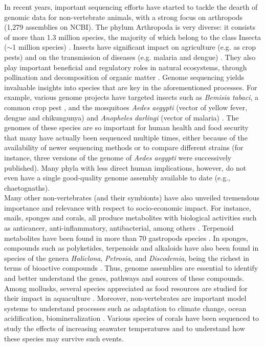 In recent years, important sequencing efforts have started to tackle the dearth of genomic data for non-vertebrate animals, with a strong focus on arthropods (1,279 assemblies on NCBI). The phylum Arthropoda is very diverse: it consists of more than 1.3 million species, the majority of which belong to the class Insecta ($\sim$1 million species) \cite{Zhang2013}. Insects have significant impact on agriculture (e.g. as crop pests) and on the transmission of diseases (e.g. malaria and dengue) \cite{li2019}. They also play important beneficial and regulatory roles in natural ecosystems, through  pollination and decomposition of organic matter \cite{noriega2018}. Genome sequencing yields invaluable insights into species that are key in the aforementioned processes. For example, various genome projects have targeted insects such as \textit{Bemisia tabaci}, a common crop pest \cite{chen2016}, and the mosquitoes \textit{Aedes aegypti} (vector of yellow fever, dengue and chikungunya) \cite{aedes_aegypti3} and \textit{Anopheles darlingi} (vector of malaria) \cite{marinotti2013}. The genomes of these species are so important for human health and food security that many have actually been sequenced multiple times, either because of the availability of newer sequencing methods or to compare different strains (for instance, three versions of the genome of \textit{Aedes aegypti} \cite{aedes_aegypti, 3d-dna, aedes_aegypti3} were successively published). Many phyla with less direct human implications, however, do not even have a single good-quality genome assembly available to date (e.g., chaetognaths). \\ 

Many other non-vertebrates (and their symbionts) have also unveiled tremendous importance and relevance with respect to socio-economic impact. For instance, snails, sponges and corals, all produce metabolites with biological activities such as anticancer, anti-inflammatory, antibacterial, among others \cite{carroll2021, khalifa2019, ng2015}. Terpenoid metabolites have been found in more than 70 gastropods species \cite{avila2020}. In sponges, compounds such as polyketides, terpenoids and alkaloids have also been found in species of the genera \textit{Haliclona}, \textit{Petrosia}, and \textit{Discodemia}, being the richest in terms of bioactive compounds \cite{Han2019}. Thus, genome assemblies are essential to identify and better understand the genes, pathways and sources of these compounds. Among mollusks, several species appreciated as food resources are studied for their impact in aquaculture \cite{takeuchi2017}. Moreover, non-vertebrates are important model systems to understand processes such as adaptation to climate change, ocean acidification, biomineralization \cite{prather2013, gomes2020, conci2021, clark2020}. Various species of corals \cite{shinzato2011, mao2018, fuller2020, shinzato2021} have been sequenced to study the effects of increasing seawater temperatures and to understand how these species may survive such events.  \\

